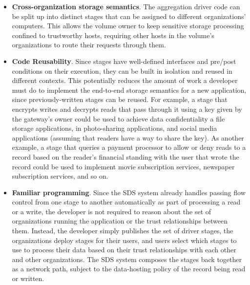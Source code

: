 \begin{itemize}
   \item \textbf{Cross-organization storage semantics}.  The aggregation driver code
      can be split up into distinct stages that can be
      assigned to different organizations' computers.  This allows the volume
      owner to keep sensitive storage processing confined to trustworthy hosts,
      requiring other hosts in the volume's organizations to route their requests
      through them.
   \item \textbf{Code Reusability}.  Since stages have well-defined interfaces
      and pre/post conditions on their execution,
      they can be built in isolation and reused in different contexts.  This
      potentially reduces the amount of work a developer must do to implement
      the end-to-end storage semantics for a new application, since
      previously-written stages can be reused.  For example, a stage that
      encrypts writes and decrypts reads that pass through it using a key given
      by the gateway's owner could be used to achieve data confidentiality a file
      storage applications, in photo-sharing applications, and social media
      applications (assuming that readers have a way to share the key).
      As another example, a stage that queries a payment
      processor to allow or deny reads to a record based on the reader's financial
      standing with the user that wrote the record could be used to implement movie
      subscription services, newspaper subscription services, and so on.
   \item \textbf{Familiar programming}.  Since the SDS system already handles passing
      flow control from one stage to another automatically as part of processing
      a read or a write, the developer is not required to reason about the set
      of organizations running the application or the trust relationships
      between them.  Instead, the developer simply publishes the set of driver
      stages, the organizations deploy stages for their users, and users select
      which stages to use to process their data based on their trust
      relationships with each other and other organizations.
      The SDS system composes the stages back together as a
      network path, subject to the data-hosting policy of the record being read
      or written.
      

\end{itemize}
